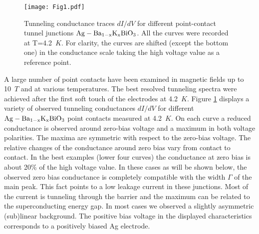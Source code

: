 \documentclass[twocolumn,amsmath,floats,showpacs,nofootinbib]{revtex4}
\begin{document}
\begin{figure}[]
\texttt{[image: Fig1.pdf]}
\caption[]{Tunneling conductance traces $dI/dV$ for different point-contact tunnel junctions $\rm Ag-Ba_{1-x}K_xBiO_3$. All the curves were recorded at T=4.2~$K$. For clarity, the curves are shifted (except the bottom one) in the conductance scale taking the high voltage value as a reference point.}
\label{Fig1}
\end{figure}

A large number of point contacts have been examined in magnetic fields up to 10~$T$ and at various temperatures. The best resolved tunneling spectra were achieved after the first soft touch of the electrodes at 4.2~$K$. Figure \ref{Fig1} displays a variety of observed tunneling conductances $dI/dV$ for different $\rm Ag-Ba_{1-x}K_xBiO_3$ point contacts measured at 4.2~$K$. On each curve a reduced conductance is observed around zero-bias voltage and a maximum in both voltage polarities. The maxima are symmetric with respect to the zero-bias voltage. The relative changes of the conductance around zero bias vary from contact to contact. In the best examples (lower four curves) the conductance at zero bias is about 20\% of the high voltage value. In these cases as will be shown below, the observed zero bias conductance is completely compatible with the width $\Gamma$ of the main peak. This fact points to a low leakage current in these junctions. Most of the current is tunneling through the barrier and the maximum can be related to the superconducting energy gap. In most cases we observed a slightly asymmetric (sub)linear background. The positive bias voltage in the displayed characteristics corresponds to a positively biased Ag electrode.
\end{document}

